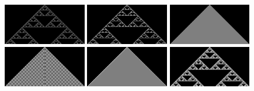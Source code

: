 \documentclass{article}
\begin{document}
\begin{figure}[h]
    \includegraphics[width=0.32\textwidth]{ca-rules/double1-close/rule-018-090-146-218.png}%
    \hspace{0.01\textwidth}%
    \includegraphics[width=0.32\textwidth]{ca-rules/double1-close/rule-022.png}%
    \hspace{0.01\textwidth}%
    \includegraphics[width=0.32\textwidth]{ca-rules/double1-close/rule-050-122-178-250.png}\\%
    \vspace{0.01\textwidth}%
    \includegraphics[width=0.32\textwidth]{ca-rules/double1-close/rule-054.png}%
    \hspace{0.01\textwidth}%
    \includegraphics[width=0.32\textwidth]{ca-rules/double1-close/rule-094.png}%
    \hspace{0.01\textwidth}%
    \includegraphics[width=0.32\textwidth]{ca-rules/double1-close/rule-126.png}\\%
    \vspace{0.01\textwidth}%

\end{figure}
\end{document}
